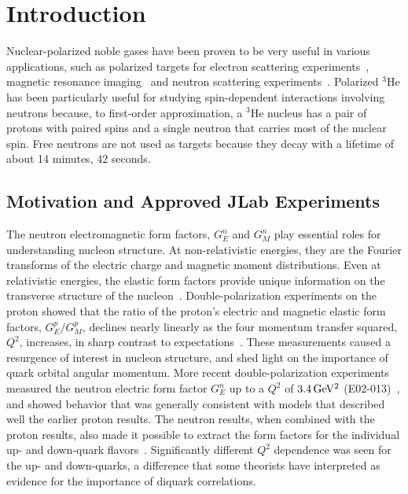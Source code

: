 \chapter{Introduction}
\label{chap:chap1}

Nuclear-polarized noble gases have been proven to be very useful in various applications, such as polarized targets for electron scattering experiments~\cite{PhysRevLett.71.959}, magnetic resonance imaging~\cite{MRI} and neutron scattering experiments~\cite{Neutron}. Polarized $^3$He has been particularly useful for studying spin-dependent interactions involving neutrons because, to first-order approximation, a $^{3}$He nucleus has a pair of protons with paired spins and a single neutron that carries most of the nuclear spin. Free neutrons are not used as targets because they decay with a lifetime of about 14 minutes, 42 seconds. 

\section{Motivation and Approved JLab Experiments}

The neutron electromagnetic form factors, $G_E^n$ and $G_M^n$ play essential roles for understanding nucleon structure. At non-relativistic energies, they are the Fourier transforms of the electric charge and magnetic moment distributions. Even at relativistic energies, the elastic form factors provide unique information on the transverse structure of the nucleon~\cite{PhysRevLett.99.112001, PhysRevLett.100.032004}. Double-polarization experiments on the proton showed that the ratio of the proton's electric and magnetic elastic form factors, $G_E^p/G_M^p$, declines nearly linearly as the four momentum transfer squared, $Q^2$, increases, in sharp contrast to expectations~\cite{PhysRevLett.84.1398}. These measurements caused a resurgence of interest in nucleon structure, and shed light on the importance of quark orbital angular momentum. More recent double-polarization experiments measured the neutron electric form factor $G_E^n$ up to a $Q^2$ of $\rm 3.4\,GeV^2$ (E02-013)~\cite{Phys.Rev.Lett.105.262302}, and showed behavior that was generally consistent with models that described well the earlier proton results. The neutron results, when combined with the proton results, also made it possible to extract the form factors for the individual up- and down-quark flavors~\cite{PhysRevLett.106.252003}. Significantly different $Q^2$ dependence was seen for the up- and down-quarks, a difference that some theorists have interpreted as evidence for the importance of diquark correlations.  

